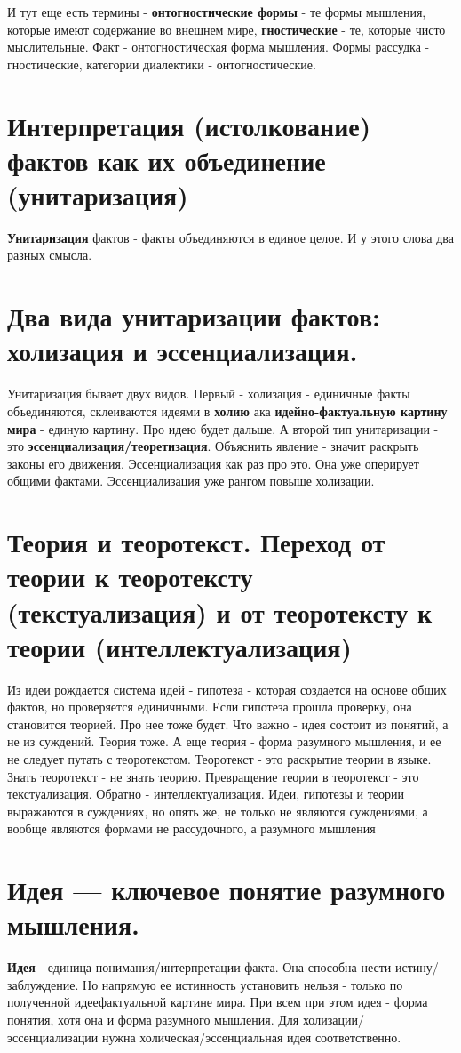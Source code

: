 И тут еще есть термины - \textbf{онтогностические формы} - те формы мышления, которые имеют содержание во внешнем мире, \textbf{гностические} - те, которые чисто мыслительные. Факт - онтогностическая форма мышления. Формы рассудка - гностические, категории диалектики - онтогностические.

\section{ Интерпретация (истолкование) фактов как их объединение (унитаризация)}
\textbf{Унитаризация} фактов - факты объединяются в единое целое. И у этого слова два разных смысла.

\section{ Два вида унитаризации фактов: холизация и эссенциализация.}
Унитаризация бывает двух видов. Первый - холизация - единичные факты объединяются, склеиваются идеями  в \textbf{холию} ака \textbf{идейно-фактуальную картину мира} - единую картину. Про идею будет дальше. А второй тип унитаризации - это \textbf{эссенциализация/теоретизация}. Объяснить явление - значит раскрыть законы его движения. Эссенциализация как раз про это. Она уже оперирует общими фактами. Эссенциализация уже рангом повыше холизации.

\section{ Теория и теоротекст. Переход от теории к теоротексту (текстуализация) и от теоротексту к теории (интеллектуализация)}
Из идеи рождается система идей - гипотеза - которая создается на основе общих фактов, но проверяется единичными. Если гипотеза прошла проверку, она становится теорией. Про нее тоже будет. Что важно - идея состоит из понятий, а не из суждений. Теория тоже. А еще теория - форма разумного мышления, и ее не следует путать с теоротекстом. Теоротекст - это раскрытие теории в языке. Знать теоротекст - не знать теорию. Превращение теории в теоротекст - это текстуализация. Обратно - интеллектуализация. Идеи, гипотезы и теории выражаются в суждениях, но опять же, не только не являются суждениями, а вообще являются формами не рассудочного, а разумного мышления

\section{ Идея — ключевое понятие разумного мышления.}
\textbf{Идея} - единица понимания/интерпретации факта. Она способна нести истину/заблуждение. Но напрямую ее истинность установить нельзя - только по полученной идеефактуальной картине мира. При всем при этом идея - форма понятия, хотя она и форма разумного мышления. Для холизации/эссенциализации нужна холическая/эссенциальная идея соответственно.

